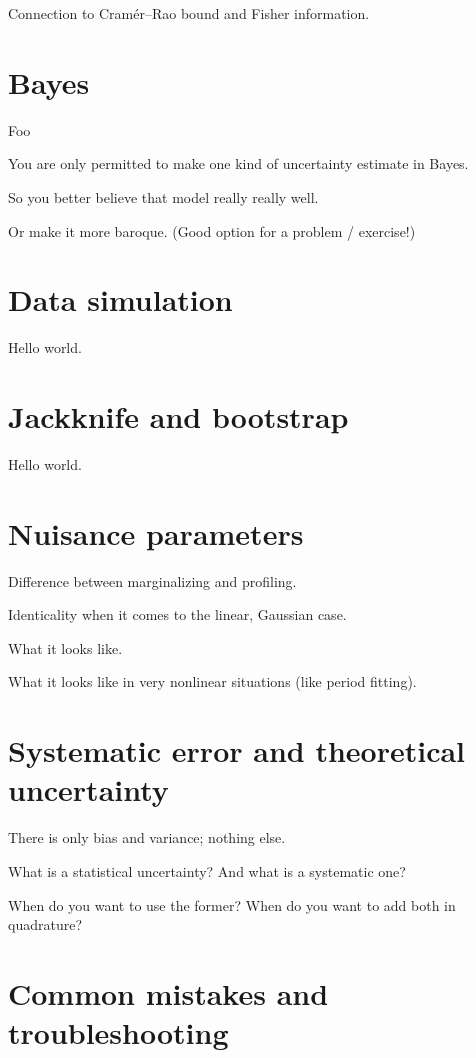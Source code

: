 \documentclass[12pt, letterpaper]{article}
\begin{document}
Connection to Cram\'er--Rao bound and Fisher information.

\section{Bayes}

Foo

You are only permitted to make one kind of uncertainty estimate in Bayes.

So you better believe that model really really well.

Or make it more baroque. (Good option for a problem / exercise!)

\section{Data simulation}

Hello world.

\section{Jackknife and bootstrap}

Hello world.

\section{Nuisance parameters}

Difference between marginalizing and profiling.

Identicality when it comes to the linear, Gaussian case.

What it looks like.

What it looks like in very nonlinear situations (like period fitting).

\section{Systematic error and theoretical uncertainty}

There is only bias and variance; nothing else.

What is a statistical uncertainty? And what is a systematic one?

When do you want to use the former? When do you want to add both in quadrature?

\section{Common mistakes and troubleshooting}
\end{document}
